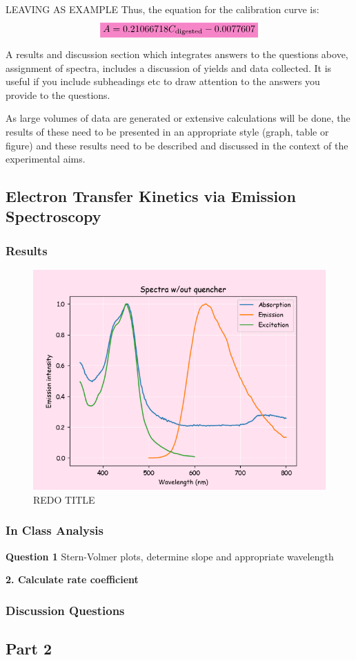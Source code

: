 \documentclass[main.tex]{subfiles}
\begin{document}
LEAVING AS EXAMPLE
Thus, the equation for the calibration curve is:
\begin{equation*}
    \mathcolorbox{Lavender}{A = 0.21066718C_{\text{digested}} -0.0077607}
\end{equation*}

A results and discussion section which integrates answers to the questions above, assignment of spectra, 
includes a discussion of yields and data collected. It is useful if you include subheadings etc to draw attention to 
the answers you provide to the questions.

As large volumes of data are generated or extensive calculations will be done, the results of these need 
to be presented in an appropriate style (graph, table or figure) and these results need to be described 
and discussed in the context of the experimental aims.

\subsection{Electron Transfer Kinetics via Emission Spectroscopy}
\subsubsection*{Results}
\begin{figure}[H]
    \centering
    \includegraphics[width = 0.7\linewidth]{part1_noq.png}
    \caption{REDO TITLE}
    \label{fig:enter-label}
\end{figure}
\subsubsection*{In Class Analysis}
\textbf{Question 1} 
Stern-Volmer plots, determine slope and appropriate wavelength


\textbf{2. Calculate rate coefficient}

\subsubsection*{Discussion Questions}

\subsection{Part 2}
\end{document}
